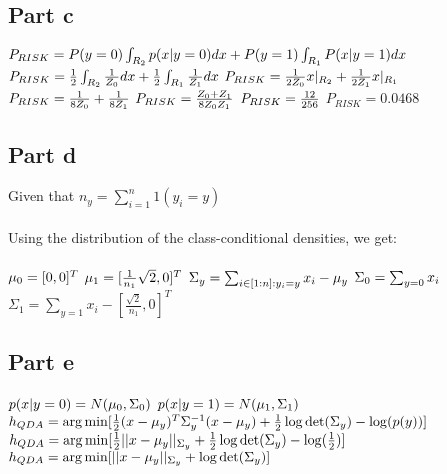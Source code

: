\documentclass[paper=a4, fontsize=11pt]{scrartcl} %
\numberwithin{equation}{section} %
\numberwithin{figure}{section} %
\numberwithin{table}{section} %
\begin{document}
	\subsection{Part c}
	$P_{RISK} = P(y=0)\int_{R_2}p(x|y=0)dx + P(y=1)\int_{R_1}P(x|y=1)dx\\\\$
	$P_{RISK} = \frac{1}{2}\int_{R_2} \frac{1}{Z_0}dx + \frac{1}{2}\int_{R_1}\frac{1}{Z_1}dx\\\\$
	$P_{RISK} = \frac{1}{2Z_0}x|_{R_2} + \frac{1}{2Z_1}x|_{R_1}\\\\$
	$P_{RISK} = \frac{1}{8Z_0} + \frac{1}{8Z_1}\\\\$
	$P_{RISK} = \frac{Z_0+Z_1}{8Z_0Z_1}\\\\$
	$P_{RISK} = \frac{12}{256}\\\\\\$
	$P_{RISK} = 0.0468$
	
	
	\subsection{Part d}
	Given that $n_y = \sum_{i=1}^n 1(y_i=y)$\\\\
	Using the distribution of the class-conditional densities, we get:\\\\
	$\mu_0 = [0,0]^T\\\\$
	$\mu_1 = [\frac{1}{n_1}\sqrt{2}, 0]^T\\\\$
	$\Sigma_y = \sum_{i\in[1:n]:y_i=y} x_i - \mu_y\\\\$
	$\Sigma_0 = \sum_{y=0} x_i\\\\$
	$\Sigma_1 = \sum_{y=1} x_i - [\frac{\sqrt{2}}{n_1}, 0]^T$
	
	

	\subsection{Part e}
	$p(x|y=0) = N(\mu_0, \Sigma_0)\\\\$
	$p(x|y=1) = N(\mu_1, \Sigma_1)\\\\$
	$h_{QDA} = \arg\min [\frac{1}{2}(x-\mu_y)^T\Sigma_y^{-1}(x-\mu_y) + \frac{1}{2}\log\det(\Sigma_y)-\log(p(y))]\\\\$
	$h_{QDA} = \arg\min[\frac{1}{2}||x-\mu_y||_{\Sigma_y} + \frac{1}{2}\log\det(\Sigma_y)-\log(\frac{1}{2})]\\\\$
	$h_{QDA} = \arg\min[||x-\mu_y||_{\Sigma_y} + \log\det(\Sigma_y)]\\\\\\\\$
	
\end{document}
